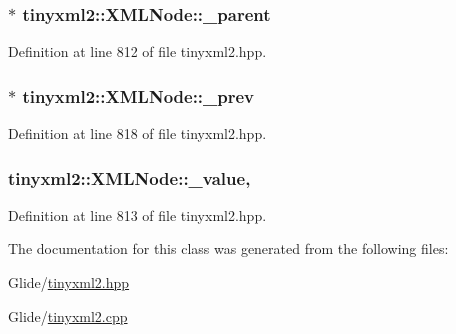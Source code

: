 \hypertarget{classtinyxml2_1_1_x_m_l_node_a176dd1c4965c21c366de192164aa2c13}{
\subsubsection[{\-\_\-parent}]{$\ast$ tinyxml2\-::\-X\-M\-L\-Node\-::\-\_\-parent\hspace{0.3cm}{\ttfamily [protected]}}}\label{classtinyxml2_1_1_x_m_l_node_a176dd1c4965c21c366de192164aa2c13}


Definition at line 812 of file tinyxml2.\-hpp.

\hypertarget{classtinyxml2_1_1_x_m_l_node_a9739eb0fb9a1188266052055e7a6bf6b}{
\subsubsection[{\-\_\-prev}]{$\ast$ tinyxml2\-::\-X\-M\-L\-Node\-::\-\_\-prev\hspace{0.3cm}{\ttfamily [protected]}}}\label{classtinyxml2_1_1_x_m_l_node_a9739eb0fb9a1188266052055e7a6bf6b}


Definition at line 818 of file tinyxml2.\-hpp.

\hypertarget{classtinyxml2_1_1_x_m_l_node_a3ea9884098b8379de2bb5ab3fc85c0fc}{
\subsubsection[{\-\_\-value}]{ tinyxml2\-::\-X\-M\-L\-Node\-::\-\_\-value\hspace{0.3cm}{\ttfamily [mutable]}, {\ttfamily [protected]}}}\label{classtinyxml2_1_1_x_m_l_node_a3ea9884098b8379de2bb5ab3fc85c0fc}


Definition at line 813 of file tinyxml2.\-hpp.



The documentation for this class was generated from the following files\-:\begin{DoxyCompactItemize}
\item 
Glide/\hyperlink{tinyxml2_8hpp}{tinyxml2.\-hpp}\item 
Glide/\hyperlink{tinyxml2_8cpp}{tinyxml2.\-cpp}\end{DoxyCompactItemize}
